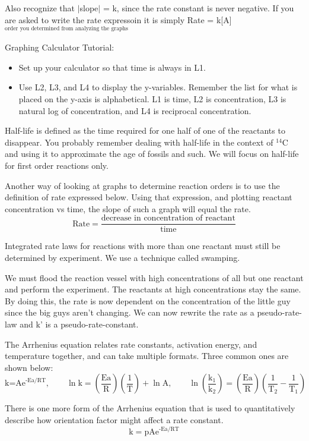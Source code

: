 \documentclass[../chem.tex]{subfiles}
\begin{document}
Also recognize that $\mid$slope$\mid$ = k, since the rate constant is never negative. If you are asked to write the rate expressoin it is simply Rate = k[A]$^{\text{order you determined from analyzing the graphs}}$

Graphing Calculator Tutorial:
\begin{itemize}
    \item Set up your calculator so that time is always in L1.
    \item Use L2, L3, and L4 to display the y-variables. Remember the list for what is placed on the y-axis is alphabetical. L1 is time, L2 is concentration, L3 is natural log of concentration, and L4 is reciprocal concentration.
\end{itemize}

Half-life is defined as the time required for one half of one of the reactants to disappear. You probably remember dealing with half-life in the context of 
$^{14}$C and using it to approximate the age of fossils and such. We will focus on half-life for first order reactions only. 

Another way of looking at graphs to determine reaction orders is to use the definition of rate expressed below. Using that expression, and plotting 
reactant concentration vs time, the slope of such a graph will equal the rate.
\[\text{Rate}=\frac{\text{decrease in concentration of reactant}}{\text{time}}\]

Integrated rate laws for reactions with more than one reactant must still be determined by experiment. We use a technique called swamping.

We must flood the reaction vessel with high concentrations of all but one reactant and perform the experiment. The reactants at high concentrations stay the same. By doing this,
the rate is now dependent on the concentration of the little guy since the big guys aren't changing. We can now rewrite the rate as a pseudo-rate-law and k' is a pseudo-rate-constant.

The Arrhenius equation relates rate constants, activation energy, and temperature together, and can take multiple formats. Three common ones are shown below:
\[\text{k=Ae}^{\text{-Ea/RT}},\qquad \ln\text{k}=\left(\frac{\text{Ea}}{\text{R}}\right)\left(\frac{1}{\text{T}}\right)+\ln \text{A}, \qquad \ln\left(\frac{\text{k}_1}{\text{k}_2}\right)=\left(\frac{\text{Ea}}{\text{R}}\right)\left(\frac{1}{\text{T}_2}-\frac{1}{\text{T}_1}\right)\]

There is one more form of the Arrhenius equation that is used to quantitatively describe how orientation factor might affect a rate constant.
\[\text{k}=\text{pAe}^{\text{-Ea/RT}}\]
\end{document}
